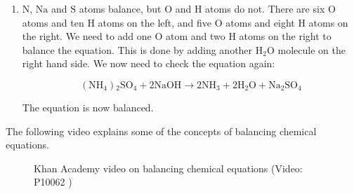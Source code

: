 {\begin{mdframed}[linewidth=4, leftmargin=40, rightmargin=40]
\begin{exercise}
\begin{enumerate}[noitemsep, label=\textbf{Step} \textbf{\arabic*}. ]
    \begin{equation}
    \left({\mathrm{NH}}_{4}\right){}_{2}{\mathrm{SO}}_{4}+2\mathrm{NaOH}\to 2\mathrm{NH}{}_{3}+\mathrm{H}{}_{2}\mathrm{O}+\mathrm{Na}{}_{2}{\mathrm{SO}}_{4}\tag{13.23}
      \end{equation}
      \par 
      \item  
      \label{m38727*id66648}$\mathrm{N}$, $\mathrm{Na}$ and $\mathrm{S}$ atoms balance, but $\mathrm{O}$ and $\mathrm{H}$ atoms do not. There are six $\mathrm{O}$ atoms and ten $\mathrm{H}$ atoms on the left, and five $\mathrm{O}$ atoms and eight $\mathrm{H}$ atoms on the right. We need to add one $\mathrm{O}$ atom and two $\mathrm{H}$ atoms on the right to balance the equation. This is done by adding another $\mathrm{H}{}_{2}\mathrm{O}$ molecule on the right hand side. We now need to check the equation again:
      \label{m38727*id66667}\nopagebreak\noindent{}
      
    \begin{equation}
    \left({\mathrm{NH}}_{4}\right){}_{2}{\mathrm{SO}}_{4}+2\mathrm{NaOH}\to 2\mathrm{NH}{}_{3}+2\mathrm{H}{}_{2}\mathrm{O}+\mathrm{Na}{}_{2}{\mathrm{SO}}_{4}\tag{13.24}
      \end{equation}
      \par 
      \label{m38727*id66774}The equation is now balanced.\par 
\end{enumerate}
    \end{exercise}
    \end{mdframed}
    }
    \noindent
\label{m38727*eip-44}The following video explains some of the concepts of balancing chemical equations.\newline
    \setcounter{subfigure}{0}
	\begin{figure}[H] %
    \textnormal{Khan Academy video on balancing chemical equations}\vspace{.1in} \nopagebreak
  \label{m38727*yt-media1}\label{m38727*yt-video1}
             { (Video:  P10062 )}
      \vspace{2pt}
    \vspace{.1in}
 \end{figure}       \par \label{m38727*secfhsst!!!underscore!!!id1261}
